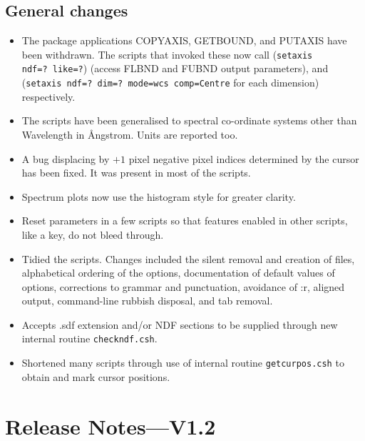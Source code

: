 \documentclass[twoside,11pt,nolof]{starlink}
\begin{document}
\subsection{General changes}

\begin{itemize}

\item The package applications COPYAXIS, GETBOUND, and PUTAXIS have
been withdrawn.  The scripts that invoked these now call
 (\texttt{setaxis ndf=?~like=?})
 (access FLBND and FUBND output
parameters), and 
(\texttt{setaxis ndf=?~dim=?~mode=wcs comp=Centre} for each dimension)
respectively.

\item The scripts have been generalised to spectral co-ordinate
systems other than Wavelength in {\AA}ngstrom.  Units are reported too.

\item A bug displacing by $+1$ pixel negative pixel indices determined
by the cursor has been fixed.  It was present in most of the scripts.

\item Spectrum plots now use the histogram style for greater clarity.

\item  Reset  parameters in a
few scripts so that features enabled in other scripts, like a key,
do not bleed through.

\item Tidied the scripts.  Changes included the silent removal and
creation of files, alphabetical ordering of the options, documentation
of default values of options, corrections to grammar and punctuation,
avoidance of :r, aligned output, command-line rubbish disposal,
and tab removal.

\item Accepts .sdf extension and/or NDF sections to be supplied
through new internal routine \texttt{checkndf.csh}.

\item Shortened many scripts through use of internal routine
\texttt{getcurpos.csh} to obtain and mark cursor positions.

\end{itemize}


\section{Release Notes---V1.2}
\end{document}

